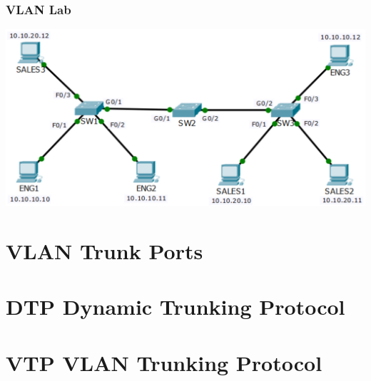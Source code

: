 \documentclass[pdflatex,compress,mathserif]{beamer}
\begin{document}
\begin{frame}
	\frametitle{VLAN Lab}
	\begin{center}
		\includegraphics[width=\linewidth]{img/img32}
	\end{center}
\end{frame}

\section{VLAN Trunk Ports}

\section{DTP Dynamic Trunking Protocol}

\section{VTP VLAN Trunking Protocol}
\end{document}
